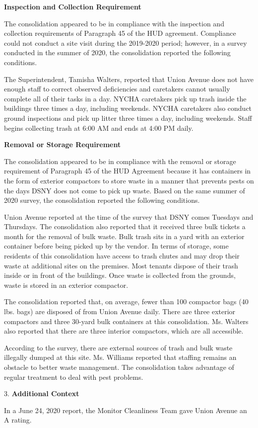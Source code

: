 
\textbf{Inspection and Collection Requirement}

The consolidation appeared to be in compliance with the inspection and collection requirements of Paragraph 45 of the HUD agreement. Compliance could not conduct a site visit during the 2019-2020 period; however, in a survey conducted in the summer of 2020, the consolidation reported the following conditions.

The Superintendent, Tamisha Walters, reported that Union Avenue does not have enough staff to correct observed deficiencies and caretakers cannot usually complete all of their tasks in a day. NYCHA caretakers pick up trash inside the buildings three times a day, including weekends. NYCHA caretakers also conduct ground inspections and pick up litter three times a day, including weekends. Staff begins collecting trash at 6:00 AM and ends at 4:00 PM daily. 

\textbf{Removal or Storage Requirement}

The consolidation appeared to be in compliance with the  removal or storage requirement of Paragraph  45 of the HUD Agreement because it has containers in the form of exterior compactors to store waste in a manner that prevents pests on the days DSNY does not come to pick up waste. Based on the same summer of  2020 survey, the consolidation reported the following conditions.

Union Avenue reported at the time of the survey that DSNY comes Tuesdays and Thursdays. The consolidation also reported that it received three bulk tickets a month for the removal of bulk waste. Bulk trash sits in a yard with an exterior container before being picked up by the vendor. In terms of storage, some residents of this consolidation have access to trash chutes and may drop their waste at additional sites on the premises. Most tenants dispose of their trash inside or in front of the buildings. Once waste is collected from the grounds, waste is stored in an exterior compactor. 

The consolidation reported that, on average, fewer than 100 compactor bags (40 lbs. bags) are disposed of from Union Avenue daily. There are three exterior compactors and three 30-yard bulk containers at this consolidation. Ms. Walters also reported that there are three interior compactors, which are all accessible.

According to the survey, there are external sources of trash and bulk waste illegally dumped at this site. Ms. Williams reported that staffing remains an obstacle to better waste management. The consolidation takes advantage of regular treatment to deal with pest problems.

3. \textbf{Additional Context} 

In a June 24, 2020 report, the Monitor Cleanliness Team gave Union Avenue an A rating. 